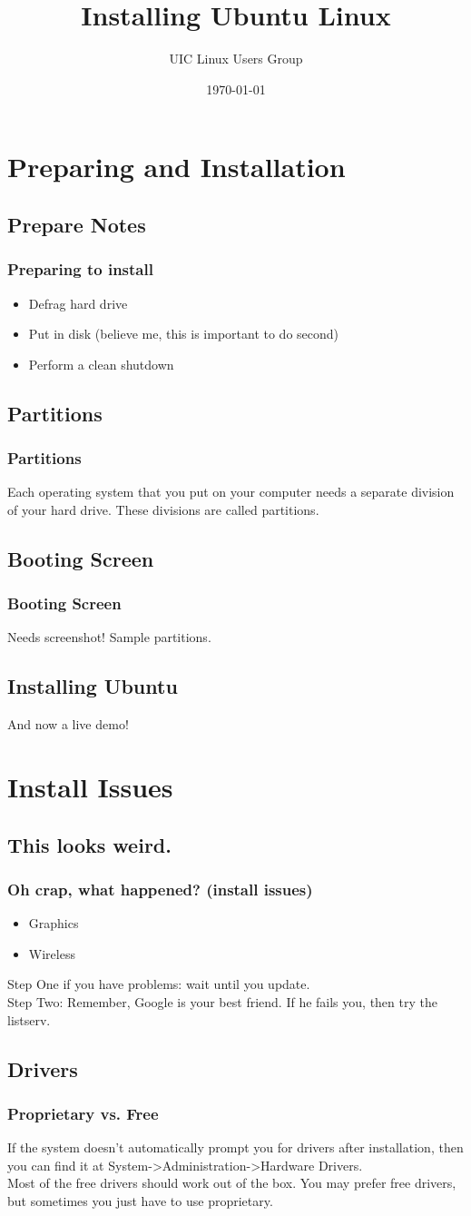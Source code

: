 \documentclass[hyperref={pdfpagelabels=false}]{beamer}
\title{Installing Ubuntu Linux}
\author{UIC Linux Users Group}
\date{\today}
\begin{document}
\frame{\titlepage}
\section{Preparing and Installation}
\subsection{Prepare Notes}
\frame
{
    \frametitle{Preparing to install}
    \begin{itemize}
    \item{Defrag hard drive}
	\item{Put in disk (believe me, this is important to do second)}
    \item{Perform a clean shutdown}
    \end{itemize}
}
\subsection{Partitions}
\frame
{
	\frametitle{Partitions}
	Each operating system that you put on your computer needs a separate division of your hard drive. These divisions are called partitions.
}
\subsection{Booting Screen}
\frame
{
	\frametitle{Booting Screen}
	Needs screenshot! Sample partitions.
}
\subsection{Installing Ubuntu}
\frame
{
	And now a live demo!
}
\section{Install Issues}
\subsection{This looks weird.}
\frame
{
	\frametitle{Oh crap, what happened? (install issues)}
	\begin{itemize}
	\item{Graphics}
	\item{Wireless}
	\end{itemize}
	Step One if you have problems: wait until you update.\\
	Step Two: Remember, Google is your best friend. If he fails you, then try the listserv.
}
\subsection{Drivers}
\frame
{
	\frametitle{Proprietary vs. Free}
	If the system doesn't automatically prompt you for drivers after installation, then you can find it at System->Administration->Hardware Drivers. \\
	Most of the free drivers should work out of the box. You may prefer free drivers, but sometimes you just have to use proprietary.
}
\end{document}
